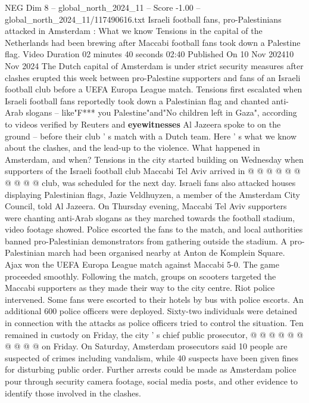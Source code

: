 \begin{textsample}{NEG Dim 8 – global\_north\_2024\_11 – Score -1.00 – global\_north\_2024\_11/117490616.txt}  \label{ex:f8_neg_303}
Israeli football fans, pro-Palestinians attacked in Amsterdam : What we know Tensions in the capital of the Netherlands had been brewing after Maccabi football fans took down a Palestine flag.
Video Duration 02 minutes 40 seconds 02:40 Published On 10 Nov 202410 Nov 2024 The Dutch capital of Amsterdam is under strict security measures after clashes erupted this week between pro-Palestine supporters and fans of an Israeli football club before a UEFA Europa League match.
Tensions first escalated when Israeli football fans reportedly took down a Palestinian flag and chanted anti-Arab slogans -- like"F*** you Palestine"and"No children left in Gaza", according to videos verified by Reuters and \textbf{eyewitnesses} Al Jazeera spoke to on the ground -- before their club ' s match with a Dutch team.
Here ' s what we know about the clashes, and the lead-up to the violence.
What happened in Amsterdam, and when?
Tensions in the city started building on Wednesday when supporters of the Israeli football club Maccabi Tel Aviv arrived in @ @ @ @ @ @ @ @ @ @ club, was scheduled for the next day.
Israeli fans also attacked houses displaying Palestinian flags, Jazie Veldhuyzen, a member of the Amsterdam City Council, told Al Jazeera.
On Thursday evening, Maccabi Tel Aviv supporters were chanting anti-Arab slogans as they marched towards the football stadium, video footage showed.
Police escorted the fans to the match, and local authorities banned pro-Palestinian demonstrators from gathering outside the stadium.
A pro-Palestinian march had been organised nearby at Anton de Komplein Square.
Ajax won the UEFA Europa League match against Maccabi 5-0.
The game proceeded smoothly.
Following the match, groups on scooters targeted the Maccabi supporters as they made their way to the city centre.
Riot police intervened.
Some fans were escorted to their hotels by bus with police escorts.
An additional 600 police officers were deployed.
Sixty-two individuals were detained in connection with the attacks as police officers tried to control the situation.
Ten remained in custody on Friday, the city ' s chief public prosecutor, @ @ @ @ @ @ @ @ @ @ on Friday.
On Saturday, Amsterdam prosecutors said 10 people are suspected of crimes including vandalism, while 40 suspects have been given fines for disturbing public order.
Further arrests could be made as Amsterdam police pour through security camera footage, social media posts, and other evidence to identify those involved in the clashes.

\end{textsample}
